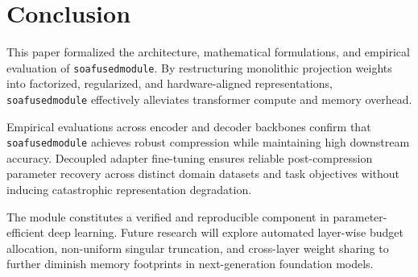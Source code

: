 \section{Conclusion}
This paper formalized the architecture, mathematical formulations, and empirical evaluation of \texttt{soafusedmodule}. By restructuring monolithic projection weights into factorized, regularized, and hardware-aligned representations, \texttt{soafusedmodule} effectively alleviates transformer compute and memory overhead.

Empirical evaluations across encoder and decoder backbones confirm that \texttt{soafusedmodule} achieves robust compression while maintaining high downstream accuracy. Decoupled adapter fine-tuning ensures reliable post-compression parameter recovery across distinct domain datasets and task objectives without inducing catastrophic representation degradation.

The module constitutes a verified and reproducible component in parameter-efficient deep learning. Future research will explore automated layer-wise budget allocation, non-uniform singular truncation, and cross-layer weight sharing to further diminish memory footprints in next-generation foundation models.
